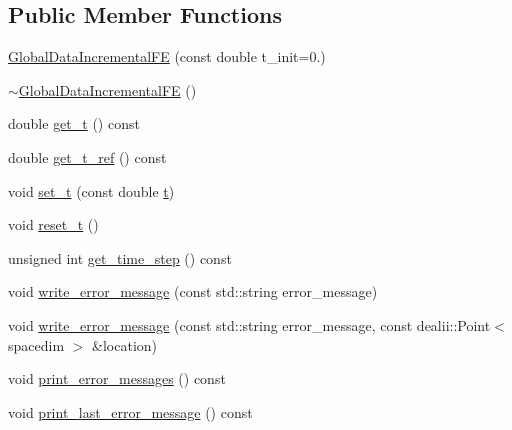 \subsection*{Public Member Functions}
\begin{DoxyCompactItemize}
\item 
\hyperlink{classincremental_f_e_1_1_global_data_incremental_f_e_ac31163d303902de96e162419a1547495}{Global\+Data\+Incremental\+FE} (const double t\+\_\+init=0.)
\item 
\hyperlink{classincremental_f_e_1_1_global_data_incremental_f_e_a718858c371f43d03f5d1c05560d62a9b}{$\sim$\+Global\+Data\+Incremental\+FE} ()
\item 
double \hyperlink{classincremental_f_e_1_1_global_data_incremental_f_e_af0064c4092b0dbb24817822c3104042f}{get\+\_\+t} () const 
\item 
double \hyperlink{classincremental_f_e_1_1_global_data_incremental_f_e_a81e09842fdcbc393a8bc9ccf3c0cdced}{get\+\_\+t\+\_\+ref} () const 
\item 
void \hyperlink{classincremental_f_e_1_1_global_data_incremental_f_e_a27354ebc5bf9ec655f5c7cc16ac9876d}{set\+\_\+t} (const double \hyperlink{classincremental_f_e_1_1_global_data_incremental_f_e_abb14e15389af3772905a3c75e12ed2c0}{t})
\item 
void \hyperlink{classincremental_f_e_1_1_global_data_incremental_f_e_ab86938372e460e4253c5cc22edffbf94}{reset\+\_\+t} ()
\item 
unsigned int \hyperlink{classincremental_f_e_1_1_global_data_incremental_f_e_a1d4f31e2249902397992cff85683c3b4}{get\+\_\+time\+\_\+step} () const 
\item 
void \hyperlink{classincremental_f_e_1_1_global_data_incremental_f_e_a9845e6a20c93b8aec769238ac23106da}{write\+\_\+error\+\_\+message} (const std\+::string error\+\_\+message)
\item 
void \hyperlink{classincremental_f_e_1_1_global_data_incremental_f_e_abf2246df069e3f8be4cd74467803159a}{write\+\_\+error\+\_\+message} (const std\+::string error\+\_\+message, const dealii\+::\+Point$<$ spacedim $>$ \&location)
\item 
void \hyperlink{classincremental_f_e_1_1_global_data_incremental_f_e_a3aaaf483ad4e6dbfc189e7ab2b44d21b}{print\+\_\+error\+\_\+messages} () const 
\item 
void \hyperlink{classincremental_f_e_1_1_global_data_incremental_f_e_a49d0b9cfe7b58e4f5e15e77733983d78}{print\+\_\+last\+\_\+error\+\_\+message} () const 
\item 

\end{DoxyCompactItemize}
